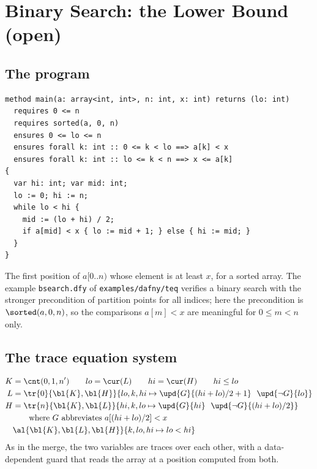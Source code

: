 \section{Binary Search: the Lower Bound (open)}\label{sec:lb}

\subsection{The program}
\begin{lstlisting}
method main(a: array<int, int>, n: int, x: int) returns (lo: int)
  requires 0 <= n
  requires sorted(a, 0, n)
  ensures 0 <= lo <= n
  ensures forall k: int :: 0 <= k < lo ==> a[k] < x
  ensures forall k: int :: lo <= k < n ==> x <= a[k]
{
  var hi: int; var mid: int;
  lo := 0; hi := n;
  while lo < hi {
    mid := (lo + hi) / 2;
    if a[mid] < x { lo := mid + 1; } else { hi := mid; }
  }
}
\end{lstlisting}
The first position of $a[0..n)$ whose element is at least $x$, for a sorted array. The example
\texttt{bsearch.dfy} of \texttt{examples/dafny/teq} verifies a binary search with the stronger
precondition of partition points for all indices; here the precondition is $\sorted(a, 0, n)$, so the
comparisons $a[m] < x$ are meaningful for $0 \le m < n$ only.

\subsection{The trace equation system}
\begin{align}
  K &= \cnt(0, 1, n') \qquad lo = \cur(L) \qquad hi = \cur(H) \qquad hi \le lo \label{eq:lb0}\\
  L &= \tr{0}{\bl{K}, \bl{H}}{lo, k, hi \mapsto \upd{G}{(hi + lo)/2 + 1}\ \ \upd{\neg G}{lo}} \label{eq:lb1}\\
  H &= \tr{n}{\bl{K}, \bl{L}}{hi, k, lo \mapsto \upd{G}{hi}\ \ \upd{\neg G}{(hi + lo)/2}} \label{eq:lb2}\\
  &\qquad\text{where } G \text{ abbreviates } a[(hi + lo)/2] < x \nonumber\\
  &\al{\bl{K}, \bl{L}, \bl{H}}{k, lo, hi \mapsto lo < hi} \label{eq:lb3}
\end{align}
As in the merge, the two variables are traces over each other, with a data-dependent guard that reads the
array at a position computed from both.


